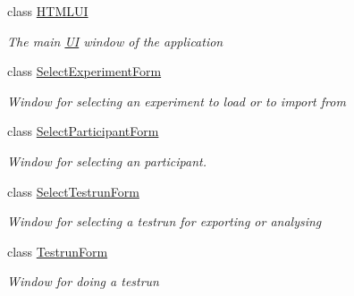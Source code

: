 \begin{DoxyCompactItemize}
class \hyperlink{class_web_analyzer_1_1_u_i_1_1_h_t_m_l_u_i}{H\+T\+M\+L\+U\+I}
\begin{DoxyCompactList}\small\item\em The main \hyperlink{namespace_web_analyzer_1_1_u_i}{U\+I} window of the application \end{DoxyCompactList}\item 
class \hyperlink{class_web_analyzer_1_1_u_i_1_1_select_experiment_form}{Select\+Experiment\+Form}
\begin{DoxyCompactList}\small\item\em Window for selecting an experiment to load or to import from \end{DoxyCompactList}\item 
class \hyperlink{class_web_analyzer_1_1_u_i_1_1_select_participant_form}{Select\+Participant\+Form}
\begin{DoxyCompactList}\small\item\em Window for selecting an participant. \end{DoxyCompactList}\item 
class \hyperlink{class_web_analyzer_1_1_u_i_1_1_select_testrun_form}{Select\+Testrun\+Form}
\begin{DoxyCompactList}\small\item\em Window for selecting a testrun for exporting or analysing \end{DoxyCompactList}\item 
class \hyperlink{class_web_analyzer_1_1_u_i_1_1_testrun_form}{Testrun\+Form}
\begin{DoxyCompactList}\small\item\em Window for doing a testrun \end{DoxyCompactList}\end{DoxyCompactItemize}
